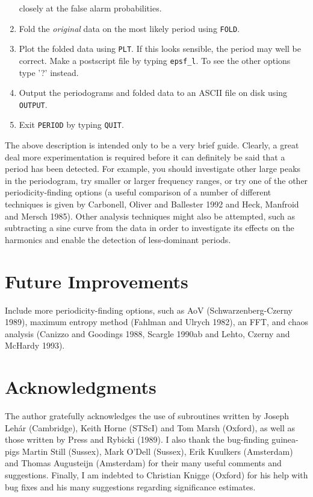 \documentclass[twoside,11pt,noabs,nolof]{starlink}
\begin{document}
\begin{enumerate}
closely at the false alarm probabilities.
\item Fold the \emph{original} data on the most likely period using \texttt{FOLD}.
\item Plot the folded data using \texttt{PLT}. If this looks sensible, the period
may well be correct. Make a postscript file by typing \texttt{epsf\_l}. To
see the other options type '?' instead.
\item Output the periodograms and folded data to an ASCII file on disk using
\texttt{OUTPUT}.
\item Exit \texttt{PERIOD} by typing \texttt{QUIT}.
\end{enumerate}

The above description is intended only to be a very brief guide. Clearly, a
great deal more experimentation is required before it can definitely be said that
a period has been detected. For example, you should investigate other large
peaks in the periodogram, try smaller or larger frequency ranges, or try one of
the other periodicity-finding options (a useful comparison of a number of
different techniques is given by Carbonell, Oliver and Ballester 1992 and Heck,
Manfroid and Mersch 1985). Other analysis techniques might also be attempted,
such as subtracting a sine curve from the data in order to investigate its
effects on the harmonics and enable the detection of less-dominant periods.

\section{Future Improvements}

Include more periodicity-finding options, such as AoV
(Schwarzenberg-Czerny 1989), maximum entropy method (Fahlman and Ulrych 1982),
an FFT, and chaos analysis (Canizzo and Goodings 1988, Scargle 1990ab and
Lehto, Czerny and McHardy 1993).

\section{Acknowledgments}

The author gratefully acknowledges the use of subroutines written by
Joseph Leh\'{a}r (Cambridge), Keith Horne (STScI) and Tom Marsh
(Oxford), as well as those written by Press and Rybicki (1989).
I also  thank
the bug-finding guinea-pigs Martin Still (Sussex), Mark O'Dell
(Sussex), Erik Kuulkers (Amsterdam) and Thomas Augusteijn (Amsterdam)
for their many useful comments and suggestions. Finally, I am indebted
to Christian Knigge (Oxford) for his help with bug fixes and his many
suggestions regarding significance estimates.
\end{document}
